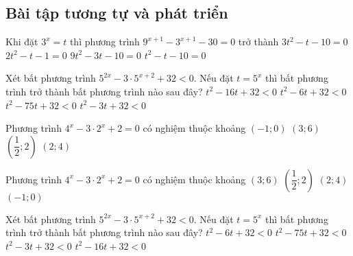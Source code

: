 \subsection{Bài tập tương tự và phát triển}
\begin{ex}%
	Khi đặt $3^x=t$ thì phương trình $9^{x+1}-3^{x+1}-30=0$ trở thành
	\choice
	{\True $3t^2-t-10=0$}
	{$2t^2-t-1=0$}
	{$9t^2-3t-10=0$}
	{$t^2-t-10=0$}
\end{ex}
\begin{ex}%
	Xét bất phương trình $5^{2x}-3\cdot5^{x+2}+32<0$. Nếu đặt $t=5^x$ thì bất phương trình trở thành bất phương trình nào sau đây?
	\choice
	{$t^2-16t+32<0$}
	{$t^2-6t+32<0$}
	{\True $t^2-75t+32<0$}
	{$t^2-3t+32<0$}
\end{ex}
\begin{ex}%
	Phương trình $4^x-3\cdot2^x+2=0$ có nghiệm thuộc khoảng
	\choice
	{$\left(-1;0\right)$}
	{$\left(3;6\right)$}
	{\True $\left(\dfrac{1}{2};2\right)$}
	{$\left(2;4\right)$}
\end{ex}
\begin{ex}%
	Phương trình $4^x-3\cdot2^x+2=0$ có nghiệm thuộc khoảng
	\choice
	{$\left(3;6\right)$}
	{\True $\left(\dfrac{1}{2};2\right)$}
	{$\left(2;4\right)$}
	{$\left(-1;0\right)$}
\end{ex}
\begin{ex}%
	Xét bất phương trình $5^{2x}-3\cdot5^{x+2}+32<0$. Nếu đặt $t=5^x$ thì bất phương trình trở thành bất phương trình nào sau đây?
	\choice
	{$t^2-6t+32<0$}
	{\True $t^2-75t+32<0$}
	{$t^2-3t+32<0$}
	{$t^2-16t+32<0$}
\end{ex}
